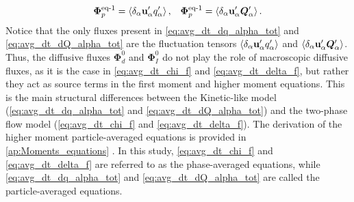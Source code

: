 \begin{align*}
    \bm\Phi_p^\text{eq-1}= \left<\delta_\alpha \textbf{u}_\alpha' q_\alpha'\right>,
    && \bm\Phi_p^\text{eq-1}= \left<\delta_\alpha \textbf{u}_\alpha' \bm{Q}_\alpha'\right>.
\end{align*}
Notice that the only fluxes present in \ref{eq:avg_dt_dq_alpha_tot} and \ref{eq:avg_dt_dQ_alpha_tot} are the fluctuation tensors $\left<\delta_\alpha \textbf{u}_\alpha' q_\alpha'\right>$ and $\left<\delta_\alpha \textbf{u}_\alpha' \bm{Q}_\alpha'\right>$. 
Thus, the diffusive fluxes $\bm\Phi_d^0$ and $\bm\Phi_I^0$ do not play the role of macroscopic diffusive fluxes, as it is the case in \ref{eq:avg_dt_chi_f} and \ref{eq:avg_dt_delta_f}, but rather they act as source terms in the first moment and higher moment equations. 
This is the main structural differences between the Kinetic-like model (\ref{eq:avg_dt_dq_alpha_tot} and \ref{eq:avg_dt_dQ_alpha_tot}) and the two-phase flow model (\ref{eq:avg_dt_chi_f} and \ref{eq:avg_dt_delta_f}). 
The derivation of the higher moment particle-averaged equations is provided in \ref{ap:Moments_equations} . 
In this study, \ref{eq:avg_dt_chi_f} and \ref{eq:avg_dt_delta_f} are referred to as the phase-averaged equations, while \ref{eq:avg_dt_dq_alpha_tot} and \ref{eq:avg_dt_dQ_alpha_tot} are called the particle-averaged equations. 

 



